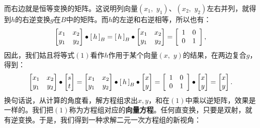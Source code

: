 \documentclass[12pt,UTF8]{ctexbook}
\begin{document}
而右边就是恒等变换的矩阵。这说明列向量$(x_1,\,\,y_1)$、$(x_2,\,\,y_2)$左右并列，就得到$h$的右逆变换$g$在$B$中的矩阵。而$h$的左逆和右逆相等，所以也有：
$$
\begin{bmatrix}
    x_1&x_2\\y_1&y_2
\end{bmatrix}\bullet\bmat{h}[B]=\bmat{h}[B]\bullet \begin{bmatrix}
    x_1&x_2\\y_1&y_2
\end{bmatrix}=\begin{bmatrix}
    \phantom{0}1&0\phantom{0}\\\phantom{0}0&1\phantom{0}
\end{bmatrix},
$$
因此，我们姑且将等式$(1)$看作$h$作用于某个向量$(x,\,\,y)$的结果，在两边复合$g$，得到：
$$
\begin{bmatrix}
    x_1&x_2\\y_1&y_2
\end{bmatrix}\bullet\begin{bmatrix}
    s\\t
\end{bmatrix} = \begin{bmatrix}
    x_1&x_2\\y_1&y_2
\end{bmatrix}\bullet\bmat{h}[B]\bullet \begin{bmatrix}
    x\\y
\end{bmatrix} = \begin{bmatrix}
    \phantom{0}1&0\phantom{0}\\\phantom{0}0&1\phantom{0}
\end{bmatrix}\bullet \begin{bmatrix}
    x\\y
\end{bmatrix} = \begin{bmatrix}
    x\\y
\end{bmatrix}.
$$
换句话说，从计算的角度看，解方程组求出$x,y$，和在$(1)$中乘以逆矩阵，效果是一样的。我们把$(1)$称为方程组对应的\textbf{向量方程}。任何直变换，只要是双射，就有逆变换。于是，我们得到一种求解二元一次方程组的新视角：

\begin{center}
\end{center}
\end{document}
